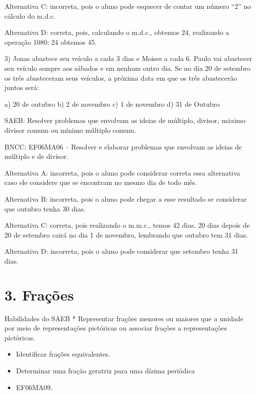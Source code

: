 Alternativa C: incorreta, pois o aluno pode esquecer de contar um número
``2'' no cálculo do m.d.c.

Alternativa D: correta, pois, calculando o m.d.c., obtemos 24,
realizando a operação 1080: 24 obtemos 45.

3) Jonas abastece seu veículo a cada 3 dias e Moises a cada 6. Paulo vai
abastecer seu veículo sempre aos sábados e em nenhum outro dia. Se no
dia 20 de setembro os três abasteceram seus veículos, a próxima data em
que os três abastecerão juntos será:

a) 20 de outubro b) 2 de novembro c) 1 de novembro d) 31 de Outubro

SAEB: Resolver problemas que envolvam as ideias de múltiplo, divisor,
máximo divisor comum ou mínimo múltiplo comum.

BNCC: EF06MA06 -- Resolver e elaborar problemas que envolvam as ideias
de múltiplo e de divisor.

Alternativa A: incorreta, pois o aluno pode considerar correta essa
alternativa caso ele considere que se encontram no mesmo dia de todo
mês.

Alternativa B: incorreta, pois o aluno pode chegar a esse resultado se
considerar que outubro tenha 30 dias.

Alternativa C: correta, pois realizando o m.m.c., temos 42 dias. 20 dias
depois de 20 de setembro cairá no dia 1 de novembro, lembrando que
outubro tem 31 dias.

Alternativa D: incorreta, pois o aluno pode considerar que setembro
tenha 31 dias.

\chapter{3. Frações}

Habilidades do SAEB * Representar frações menores ou maiores que a
unidade por meio de representações pictóricas ou associar frações a
representações pictóricas.

\begin{itemize}
\item
  Identificar frações equivalentes.
\item
  Determinar uma fração geratriz para uma dízima periódica
\end{itemize}


\begin{itemize}
\item EF06MA09.
\end{itemize}

